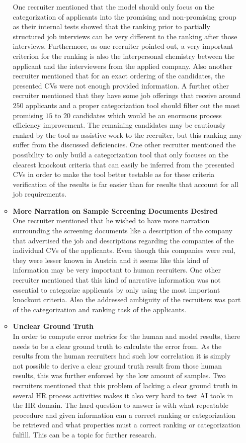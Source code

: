 \documentclass[draft,final]{thesisclass} %
\begin{document}
\begin{enumerate}
\begin{itemize}
        One recruiter mentioned that the model should only focus on the categorization of applicants into the promising and non-promising group as their internal tests showed that the ranking prior to partially structured job interviews can be very different to the ranking after those interviews. Furthermore, as one recruiter pointed out, a very important criterion for the ranking is also the interpersonal chemistry between the applicant and the interviewers from the applied company. Also another recruiter mentioned that for an exact ordering of the candidates, the presented \acs{CV}s were not enough provided information. A further other recruiter mentioned that they have some job offerings that receive around $250$ applicants and a proper categorization tool should filter out the most promising $15$ to $20$ candidates which would be an enormous process efficiency improvement. The remaining candidates may be cautiously ranked by the tool as assistive work to the recruiter, but this ranking may suffer from the discussed deficiencies. One other recruiter mentioned the possibility to only build a categorization tool that only focuses on the clearest knockout criteria that can easily be inferred from the presented \acs{CV}s in order to make the tool better testable as for these criteria verification of the results is far easier than for results that account for all job requirements.
        \item \textbf{More Narration on Sample Screening Documents Desired}\\
        One recruiter mentioned that he wished to have more narration surrounding the screening documents like a description of the company that advertised the job and descriptions regarding the companies of the individual \acs{CV}s of the applicants. Even though this companies were real, they were lesser known in Austria and it seems like this kind of information may be very important to human recruiters. One other recruiter mentioned that this kind of narrative information was not essential to categorize applicants by only using the most important knockout criteria. Also the addressed ambiguity of the recruiters was part of the categorization and ranking task of the applicants.
        \item \textbf{Unclear Ground Truth}\\
        In order to compute error metrics for the human and model results, there needs to be a clear ground truth to calculate the error from. As the results from the human recruiters had such low correlation it is simply not possible to derive a clear ground truth result from those human results, this was further enforced by the low amount of samples. Two recruiters mentioned that this problem of lacking a clear ground truth in several \acs{HR} process activities makes it also very hard to test \acs{AI} tools in the \acs{HR} domain. The hard question to answer is with what repeatable procedure and given information can a correct ranking or categorization be retrieved and what properties must a correct ranking or categorization fulfill. This can be a topic for further research.

\end{itemize}
\end{enumerate}
\end{document}
